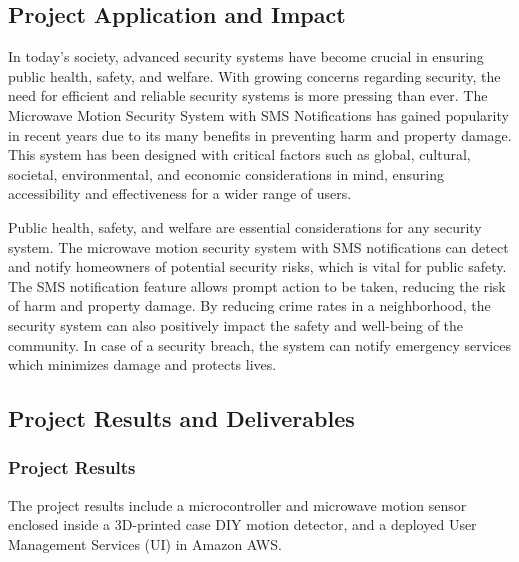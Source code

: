 \subsection{Project Application and Impact}\label{subsec:project-application-and-impact}

In today's society, advanced security systems have become crucial in ensuring public
health, safety, and welfare. With growing concerns regarding security, the need for
efficient and reliable security systems is more pressing than ever. The Microwave Motion
Security System with SMS Notifications has gained popularity in recent years due to its
many benefits in preventing harm and property damage. This system has been designed
with critical factors such as global, cultural, societal, environmental, and economic
considerations in mind, ensuring accessibility and effectiveness for a wider range of users.

Public health, safety, and welfare are essential considerations for any security system.
The microwave motion security system with SMS notifications can detect and notify homeowners
of potential security risks, which is vital for public safety. The SMS notification feature
allows prompt action to be taken, reducing the risk of harm and property damage. By reducing
crime rates in a neighborhood, the security system can also positively impact the safety
and well-being of the community. In case of a security breach, the system can notify emergency
services which minimizes damage and protects lives.

\subsection{Project Results and Deliverables}\label{subsec:project-results-and-deliverables}

\subsubsection{Project Results}

The project results include a microcontroller and microwave motion sensor enclosed inside a
3D-printed case DIY motion detector, and a deployed User Management Services (UI) in Amazon
AWS\@.